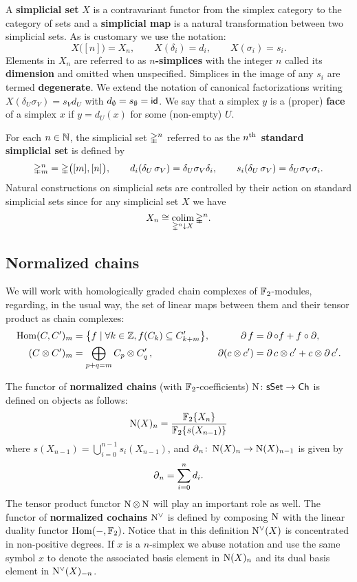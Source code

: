 A \textbf{simplicial set} $X$ is a contravariant functor from the simplex category to the category of sets and a \textbf{simplicial map} is a natural transformation between two simplicial sets.
As is customary we use the notation:
\[
X \big( [n] \big) = X_n, \qquad
X(\delta_i) = d_i, \qquad
X(\sigma_i) = s_i.
\]
Elements in $X_n$ are referred to as \mbox{\textbf{$n$-simplices}} with the integer $n$ called its \textbf{dimension} and omitted when unspecified.
Simplices in the image of any $s_i$ are termed \textbf{degenerate}.
We extend the notation of canonical factorizations writing $X(\delta_U \sigma_V) = s_V d_U$ with $d_\emptyset = s_\emptyset = \mathsf{id}$.
We say that a simplex $y$ is a (proper) \textbf{face} of a simplex $x$ if $y = d_U(x)$ for some (non-empty) $U$.

For each $n \in \mathbb{N}$, the simplicial set $\mathbb{\Delta}^n$ referred to as the \textbf{$n^{\mathrm{th}}$ standard simplicial set} is defined by
\[
\mathbb{\Delta}^n_m = \mathbb{\Delta} \big( [m], [n] \big), \qquad
d_i(\delta_U\, \sigma_V) = \delta_U \sigma_V \delta_i, \qquad
s_i(\delta_U\, \sigma_V) = \delta_U \sigma_V \sigma_i.
\]
Natural constructions on simplicial sets are controlled by their action on standard simplicial sets since for any simplicial set $X$ we have
\[
X_n \cong \operatorname*{colim}_{\mathbb{\Delta}^n \downarrow X} \mathbb{\Delta}^n.
\]

\subsection{Normalized chains}

We will work with homologically graded chain complexes of ${\mathbb{F}_2}$-modules, regarding, in the usual way, the set of linear maps between them and their tensor product as chain complexes:
\begin{align*}
\mathrm{Hom}(C, C^\prime)_m &= \big\{f \mid \forall k \in \mathbb{Z}, f(C_k) \subseteq C^\prime_{k+m} \big\},
&\operatorname{\partial} f &= \operatorname{\partial} \circ f + f \circ \operatorname{\partial}, \\
(C \otimes C^\prime)_m &= \bigoplus_{p + q = m} C_p \otimes C^\prime_q \,,
&\operatorname{\partial} (c \otimes c^\prime) &= \operatorname{\partial} c \otimes c^\prime + c \otimes \operatorname{\partial} c^\prime.
\end{align*}

The functor of \textbf{normalized chains} (with ${\mathbb{F}_2}$-coefficients) $\operatorname{N} \colon \mathsf{sSet} \to \mathsf{Ch}$ is defined on objects as follows:
\[
\operatorname{N}(X)_n = \frac{{\mathbb{F}_2} \{ X_n \}}{{\mathbb{F}_2} \{ s(X_{n-1}) \}}
\]
where $s(X_{n-1}) = \bigcup_{i=0}^{n-1} s_i(X_{n-1})$, and $\operatorname{\partial}_n \colon \operatorname{N}(X)_n \to \operatorname{N}(X)_{n-1}$ is given by
\[
\operatorname{\partial}_n = \sum_{i = 0}^{n} d_{i}.
\]
The tensor product functor $\operatorname{N} \otimes \operatorname{N}$ will play an important role as well.
The functor of \textbf{normalized cochains} $\operatorname{N^{\vee}}$ is defined by composing $\operatorname{N}$ with the linear duality functor $\mathrm{Hom}(-, {\mathbb{F}_2})$.
Notice that in this definition $\operatorname{N^{\vee}}(X)$ is concentrated in non-positive degrees.
If $x$ is a $n$-simplex we abuse notation and use the same symbol $x$ to denote the associated basis element in $\operatorname{N}(X)_n$ and its dual basis element in $\operatorname{N^{\vee}}(X)_{-n}$.